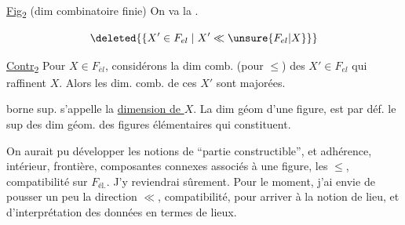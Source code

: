 \uline{Fig}\textsubscript{2} (dim combinatoire finie) On va
la  . 

\[
\deleted{\{X'\in F_{el}\mid X'\ll \unsure{F_{el}|X}\}}
\]

\uline{Contr}\textsubscript{2} Pour  $X\in F_{\bar e l}$, considérons la dim comb. (pour $\leq$) des $X'\in F_{el}$  qui raffinent $X$. Alors les dim. comb. de ces $X'$ sont majorées.

 borne sup. s'appelle la \uline{dimension  de $X$}. La dim géom d'une figure, est par déf. le sup des dim géom. des  figures élémentaires qui  constituent.


On aurait pu développer  les notions de ``partie constructible'', et adhérence, intérieur, frontière, composantes connexes associés à une figure,  les   $\leq$, compatibilité sur   $F_{\text{él.}}$.
J'y reviendrai sûrement. Pour le moment, j'ai envie de pousser  un peu  la direction $\ll$, compatibilité,
pour arriver à la notion de lieu, et d'interprétation des données en termes de lieux.

